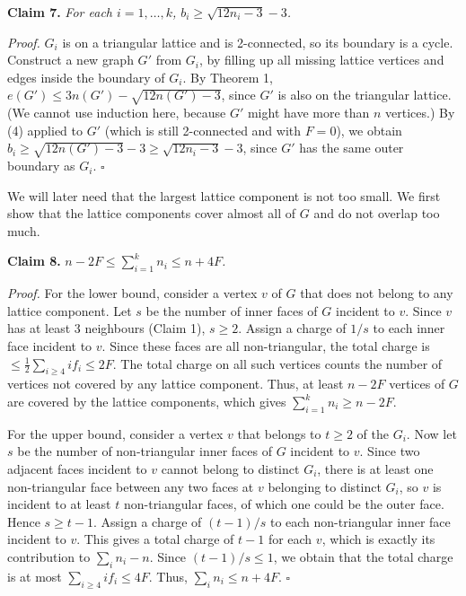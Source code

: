 \documentclass{article}
\begin{document}
\textbf{Claim 7.} \textit{For each $i = 1, \ldots, k$, $b_{i} \ge \sqrt{12n_{i} - 3} - 3$.}

\textit{Proof.} $G_{i}$ is on a triangular lattice and is 2-connected, so its boundary is a cycle. Construct a new graph $G'$ from $G_{i}$, by filling up all missing lattice vertices and edges inside the boundary of $G_{i}$. By Theorem 1, $e(G') \le 3n(G') - \sqrt{12n(G') - 3}$, since $G'$ is also on the triangular lattice. (We cannot use induction here, because $G'$ might have more than $n$ vertices.) By (4) applied to $G'$ (which is still 2-connected and with $F = 0$), we obtain $b_{i} \ge \sqrt{12n(G') - 3} - 3 \ge \sqrt{12n_{i} - 3} - 3$, since $G'$ has the same outer boundary as $G_{i}$. \hfill$\square$

We will later need that the largest lattice component is not too small. We first show that the lattice components cover almost all of $G$ and do not overlap too much.

\textbf{Claim 8.} $n - 2F \le \sum^{k}_{i = 1} n_{i} \le n + 4F$\textit{.}

\textit{Proof.} For the lower bound, consider a vertex $v$ of $G$ that does not belong to any lattice component. Let $s$ be the number of inner faces of $G$ incident to $v$. Since $v$ has at least 3 neighbours (Claim 1), $s \ge 2$. Assign a charge of $1/s$ to each inner face incident to $v$. Since these faces are all non-triangular, the total charge is $\le \frac{1}{2} \sum_{i\ge 4} if_{i} \le 2F$. The total charge on all such vertices counts the number of vertices not covered by any lattice component. Thus, at least $n - 2F$ vertices of $G$ are covered by the lattice components, which gives $\sum^{k}_{i = 1} n_{i} \ge n - 2F$.

For the upper bound, consider a vertex $v$ that belongs to $t \ge 2$ of the $G_{i}$. Now let $s$ be the number of non-triangular inner faces of $G$ incident to $v$. Since two adjacent faces incident to $v$ cannot belong to distinct $G_{i}$, there is at least one non-triangular face between any two faces at $v$ belonging to distinct $G_{i}$, so $v$ is incident to at least $t$ non-triangular faces, of which one could be the outer face. Hence $s \ge t - 1$. Assign a charge of $(t - 1)/s$ to each non-triangular inner face incident to $v$. This gives a total charge of $t - 1$ for each $v$, which is exactly its contribution to $\sum_{i} n_{i} - n$. Since $(t - 1)/s \le 1$, we obtain that the total charge is at most $\sum_{i\ge 4} if_{i} \le 4F$. Thus, $\sum_{i} n_{i} \le n + 4F$. \hfill$\square$
\end{document}
